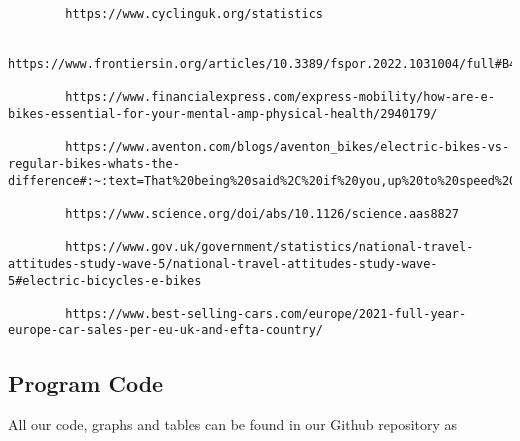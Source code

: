 \documentclass{mcm}
\numberwithin{figure}{section}
\numberwithin{table}{section}
\numberwithin{equation}{section}
\begin{document}
\begin{lstlisting}
        https://www.cyclinguk.org/statistics 
        
        https://www.frontiersin.org/articles/10.3389/fspor.2022.1031004/full#B4

        https://www.financialexpress.com/express-mobility/how-are-e-bikes-essential-for-your-mental-amp-physical-health/2940179/

        https://www.aventon.com/blogs/aventon_bikes/electric-bikes-vs-regular-bikes-whats-the-difference#:~:text=That%20being%20said%2C%20if%20you,up%20to%20speed%20after%20coasting

        https://www.science.org/doi/abs/10.1126/science.aas8827

        https://www.gov.uk/government/statistics/national-travel-attitudes-study-wave-5/national-travel-attitudes-study-wave-5#electric-bicycles-e-bikes

        https://www.best-selling-cars.com/europe/2021-full-year-europe-car-sales-per-eu-uk-and-efta-country/
    \end{lstlisting}

    \subsection{Program Code}
    All our code, graphs and tables can be found in our Github repository as
\end{document}
